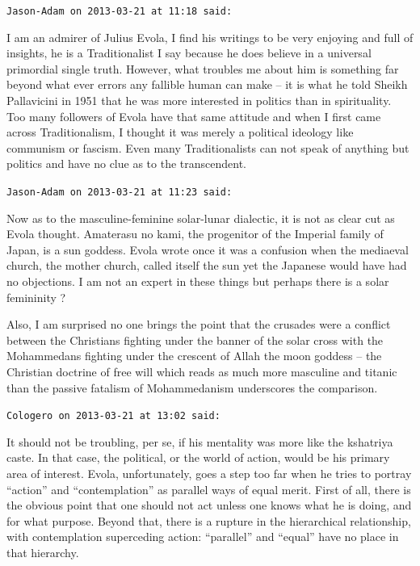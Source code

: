 \begin{footnotesize}
\begin{sffamily}
\hfill

\texttt{Jason-Adam on 2013-03-21 at 11:18 said:}

I am an admirer of Julius Evola, I find his writings to be very enjoying and full of insights, he is a Traditionalist I say because he does believe in a universal primordial single truth. However, what troubles me about him is something far beyond what ever errors any fallible human can make -- it is what he told Sheikh Pallavicini in 1951 that he was more interested in politics than in spirituality. Too many followers of Evola have that same attitude and when I first came across Traditionalism, I thought it was merely a political ideology like communism or fascism. Even many Traditionalists can not speak of anything but politics and have no clue as to the transcendent.

\hfill

\texttt{Jason-Adam on 2013-03-21 at 11:23 said:}

Now as to the masculine-feminine solar-lunar dialectic, it is not as clear cut as Evola thought. Amaterasu no kami, the progenitor of the Imperial family of Japan, is a sun goddess. Evola wrote once it was a confusion when the mediaeval church, the mother church, called itself the sun yet the Japanese would have had no objections. I am not an expert in these things but perhaps there is a solar femininity ?

Also, I am surprised no one brings the point that the crusades were a conflict between the Christians fighting under the banner of the solar cross with the Mohammedans fighting under the crescent of Allah the moon goddess -- the Christian doctrine of free will which reads as much more masculine and titanic than the passive fatalism of Mohammedanism underscores the comparison.

\hfill

\texttt{Cologero on 2013-03-21 at 13:02 said:}

It should not be troubling, per se, if his mentality was more like the kshatriya caste. In that case, the political, or the world of action, would be his primary area of interest. Evola, unfortunately, goes a step too far when he tries to portray ``action'' and ``contemplation'' as parallel ways of equal merit. First of all, there is the obvious point that one should not act unless one knows what he is doing, and for what purpose. Beyond that, there is a rupture in the hierarchical relationship, with contemplation superceding action: ``parallel'' and ``equal'' have no place in that hierarchy.


\end{sffamily}
\end{footnotesize}
